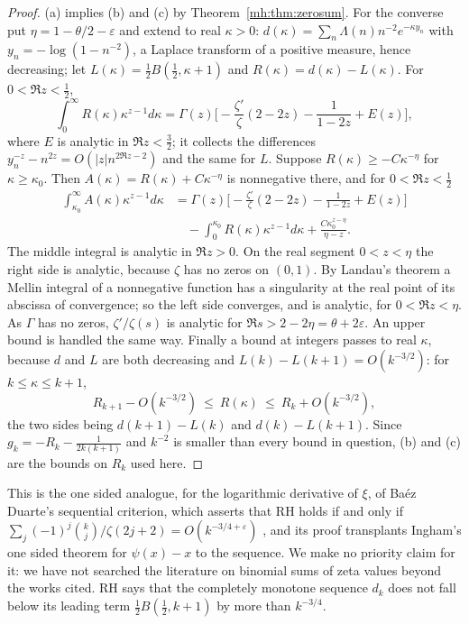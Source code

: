 \begin{proof}
(a) implies (b) and (c) by Theorem~\ref{mh:thm:zerosum}. For the converse put $\eta=1-\theta/2-\varepsilon$ and extend to real $\kappa>0$: $d(\kappa)=\sum_n\Lambda(n)n^{-2}e^{-\kappa y_n}$ with $y_n=-\log(1-n^{-2})$, a Laplace transform of a positive measure, hence decreasing; let $L(\kappa)=\tfrac12B(\tfrac12,\kappa+1)$ and $R(\kappa)=d(\kappa)-L(\kappa)$. For $0<\Re z<\tfrac12$,
\[
\int_0^\infty R(\kappa)\kappa^{z-1}d\kappa=\Gamma(z)\Big[-\frac{\zeta'}{\zeta}(2-2z)-\frac{1}{1-2z}+E(z)\Big],
\]
where $E$ is analytic in $\Re z<\tfrac32$; it collects the differences $y_n^{-z}-n^{2z}=O(|z|n^{2\Re z-2})$ and the same for $L$. Suppose $R(\kappa)\ge-C\kappa^{-\eta}$ for $\kappa\ge\kappa_0$. Then $A(\kappa)=R(\kappa)+C\kappa^{-\eta}$ is nonnegative there, and for $0<\Re z<\tfrac12$
\begin{align*}
\int_{\kappa_0}^\infty A(\kappa)\kappa^{z-1}d\kappa&=\Gamma(z)\Big[-\frac{\zeta'}{\zeta}(2-2z)-\frac{1}{1-2z}+E(z)\Big]\\
&\quad-\int_0^{\kappa_0}R(\kappa)\kappa^{z-1}d\kappa+\frac{C\kappa_0^{z-\eta}}{\eta-z}.
\end{align*}
The middle integral is analytic in $\Re z>0$. On the real segment $0<z<\eta$ the right side is analytic, because $\zeta$ has no zeros on $(0,1)$. By Landau's theorem a Mellin integral of a nonnegative function has a singularity at the real point of its abscissa of convergence; so the left side converges, and is analytic, for $0<\Re z<\eta$. As $\Gamma$ has no zeros, $\zeta'/\zeta(s)$ is analytic for $\Re s>2-2\eta=\theta+2\varepsilon$. An upper bound is handled the same way. Finally a bound at integers passes to real $\kappa$, because $d$ and $L$ are both decreasing and $L(k)-L(k+1)=O(k^{-3/2})$: for $k\le\kappa\le k+1$,
\[
R_{k+1}-O(k^{-3/2})\ \le\ R(\kappa)\ \le\ R_k+O(k^{-3/2}),
\]
the two sides being $d(k+1)-L(k)$ and $d(k)-L(k+1)$. Since $g_k=-R_k-\frac1{2k(k+1)}$ and $k^{-2}$ is smaller than every bound in question, (b) and (c) are the bounds on $R_k$ used here.
\end{proof}

This is the one sided analogue, for the logarithmic derivative of $\xi$, of Ba\'ez Duarte's sequential criterion, which asserts that RH holds if and only if $\sum_j(-1)^j\binom kj/\zeta(2j+2)=O(k^{-3/4+\varepsilon})$ \cite{BaezDuarte03}, and its proof transplants Ingham's one sided theorem for $\psi(x)-x$ \cite{Ingham32} to the sequence. We make no priority claim for it: we have not searched the literature on binomial sums of zeta values beyond the works cited. RH says that the completely monotone sequence $d_k$ does not fall below its leading term $\frac12B(\frac12,k+1)$ by more than $k^{-3/4}$.


